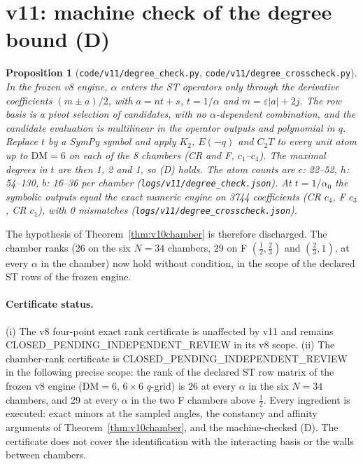 \documentclass[11pt,a4paper]{article}
\newcommand{\loc}[1]{\nolinkurl{#1}}
\newcommand{\CPIR}{\textsf{CLOSED\_PENDING\_}\allowbreak\textsf{INDEPENDENT\_REVIEW}}
\theoremstyle{plain}
\newtheorem{proposition}[theorem]{Proposition}
\theoremstyle{definition}
\theoremstyle{remark}
\numberwithin{equation}{section}
\begin{document}
\section{v11: machine check of the degree bound (D)}
\label{sec:v11D}

\begin{proposition}[\loc{code/v11/degree_check.py}, \loc{code/v11/degree_crosscheck.py}]
\label{prop:v11D}
In the frozen v8 engine, \(\alpha\) enters the ST operators only
through the derivative coefficients \((m\pm a)/2\), with
\(a=nt+s\), \(t=1/\alpha\) and \(m=\varepsilon|a|+2j\). The row
basis is a pivot \emph{selection} of candidates, with no
\(\alpha\)-dependent combination, and the candidate evaluation is
multilinear in the operator outputs and polynomial in \(q\).
Replace \(t\) by a SymPy symbol and apply \(K_2\), \(E(-q)\) and
\(C_2T\) to every unit atom up to \(\mathrm{DM}=6\) on each of the
8 chambers (CR and F, \(c_1\)--\(c_4\)). The maximal degrees in
\(t\) are then 1, 2 and 1, so (D) holds. The atom counts are
\(c\): 22--52, \(h\): 54--130, \(b\): 16--36 per chamber
(\loc{logs/v11/degree_check.json}). At \(t=1/\alpha_0\) the symbolic
outputs equal the exact numeric engine on 3744 coefficients (CR
\(c_4\), F \(c_3\), CR \(c_1\)), with 0 mismatches
(\loc{logs/v11/degree_crosscheck.json}).
\end{proposition}
The hypothesis of Theorem~\ref{thm:v10chamber} is therefore
discharged. The chamber ranks (26 on the six \(N=34\) chambers, 29
on F \((\tfrac12,\tfrac23)\) and \((\tfrac23,1)\), at every
\(\alpha\) in the chamber) now hold without condition, in the scope
of the declared ST rows of the frozen engine.

\paragraph{Certificate status.} (i) The v8 four-point exact rank
certificate is unaffected by v11 and remains
\CPIR{} in its v8 scope. (ii) The chamber-rank certificate is
\CPIR{} in the following precise scope: the rank of the declared ST
row matrix of the frozen v8 engine (\(\mathrm{DM}=6\), \(6\times6\)
\(q\)-grid) is 26 at every \(\alpha\) in the six \(N=34\) chambers,
and 29 at every \(\alpha\) in the two F chambers above
\(\tfrac12\). Every ingredient is executed: exact minors at the
sampled angles, the constancy and affinity arguments of
Theorem~\ref{thm:v10chamber}, and the machine-checked (D). The
certificate does not cover the identification with the interacting
basis or the walls between chambers.
\end{document}
